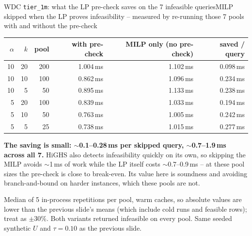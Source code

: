 \documentclass[aspectratio=169,10pt]{beamer}
\newcommand{\highlight}[1]{{\color{Cat1}\bfseries #1}}
\begin{document}
\begin{frame}{WDC \texttt{tier\_1m}: what the LP pre-check saves on the 7 infeasible queries}{MILP skipped when the LP proves infeasibility -- measured by re-running those 7 pools with and without the pre-check}
\small
\begin{center}
\begin{tabular}{rrrrrr}
\toprule
$\alpha$ & $k$ & pool & with pre-check & MILP only (no pre-check) & saved / query \\
\midrule
10 & 20 & 200 & 1.004\,ms & 1.102\,ms & 0.098\,ms \\
10 & 10 & 100 & 0.862\,ms & 1.096\,ms & 0.234\,ms \\
10 & 5 & 50 & 0.895\,ms & 1.133\,ms & 0.238\,ms \\
5 & 20 & 100 & 0.839\,ms & 1.033\,ms & 0.194\,ms \\
5 & 10 & 50 & 0.763\,ms & 1.005\,ms & 0.242\,ms \\
5 & 5 & 25 & 0.738\,ms & 1.015\,ms & 0.277\,ms \\
\bottomrule
\end{tabular}
\end{center}

\vspace{6pt}
\highlight{The saving is small: $\sim$0.1--0.28\,ms per skipped query, $\sim$0.7--1.9\,ms across all 7.} HiGHS also detects infeasibility quickly on its own, so skipping the MILP avoids $\sim$1\,ms of work while the LP itself costs $\sim$0.7--0.9\,ms -- at these pool sizes the pre-check is close to break-even. Its value here is soundness and avoiding branch-and-bound on harder instances, which these pools are not.

\vspace{2pt}
{\footnotesize\color{Muted} Median of 5 in-process repetitions per pool, warm caches, so absolute values are lower than the previous slide's means (which include cold runs and feasible rows); treat as $\pm$30\%. Both variants returned infeasible on every pool. Same seeded synthetic $U$ and $\tau{=}0.10$ as the previous slide.}
\end{frame}
\end{document}
